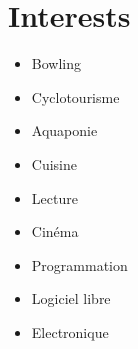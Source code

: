 \section{Interests}

\begin{cv_content}

\vspace{3mm}

\noindent
\begin{minipage}{.30\textwidth}
\raggedright
\begin{itemize}
    \item Bowling
    \item Cyclotourisme
    \item Aquaponie
\end{itemize}
\end{minipage}%
\hspace{5mm}
\begin{minipage}{.30\textwidth}
\raggedright
\begin{itemize}
    \item Cuisine
    \item Lecture
    \item Cinéma
\end{itemize}
\end{minipage}
\hspace{5mm}
\begin{minipage}{.30\textwidth}
\raggedright
\begin{itemize}
    \item Programmation
    \item Logiciel libre
    \item Electronique
\end{itemize}
\end{minipage}

\end{cv_content}
